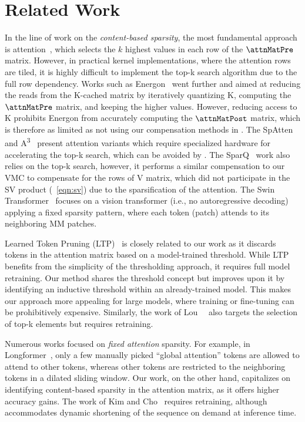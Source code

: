 \section{Related Work}
\label{sec:related_work}
%

%
In the line of work on the \textit{content-based sparsity}, the most fundamental approach is \topk attention~\cite{gupta2021memory}, which selects the  $k$ highest values in each row of the $\attnMatPre$ matrix. However, in practical kernel implementations, where the attention rows are tiled, it is highly difficult to implement the top-k search algorithm due to the full row dependency. Works such as Energon~\cite{zhou2022energon} went further and aimed at reducing the reads from the K-cached matrix by iteratively quantizing K, computing the $\attnMatPre$ matrix, and keeping the higher values. However, reducing access to K prohibits Energon from accurately computing the $\attnMatPost$ matrix, which is therefore as limited as not using our compensation methods in \topth. The SpAtten~\cite{wang2021spatten} and A\textsuperscript{3}~\cite{ham2020a3acceleratingattentionmechanisms} present \topk attention variants which require specialized hardware for accelerating the top-k search, which can be avoided by \topth. The SparQ~\cite{ribar2023sparq} work also relies on the top-k search, however, it performs a similar compensation to our VMC to compensate for the rows of V matrix, which did not participate in the SV product (~\ref{eqn:sv}) due to the sparsification of the attention. The Swin Transformer~\cite{liu2021swin} focuses on a vision transformer (i.e., no autoregressive decoding) applying a fixed sparsity pattern, where each token (patch) attends to its neighboring M\texttimes M patches.
%

%
Learned Token Pruning (LTP)~\cite{kim2022learned} is closely related to our work as it discards tokens in the attention matrix based on a model-trained threshold. While LTP benefits from the simplicity of the thresholding approach, it requires full model retraining. Our method shares the threshold concept but improves upon it by identifying an inductive threshold within an already-trained model. This makes our approach more appealing for large models, where training or fine-tuning can be prohibitively expensive. Similarly, the work of Lou~\etal~\cite{lou2024sparserfastermoreefficient} also targets the selection of top-k elements but requires retraining.
%

%
Numerous works focused on \textit{fixed attention} sparsity. For example, in Longformer~\cite{beltagy2020longformer}, only a few manually picked ``global attention'' tokens are allowed to attend to other tokens, whereas other tokens are restricted to the neighboring tokens in a dilated sliding window. Our work, on the other hand, capitalizes on identifying content-based sparsity in the attention matrix, as it offers higher accuracy gains. The work of Kim and Cho~\cite{kim2021lengthadaptivetransformertrainlength} requires retraining, although accommodates dynamic shortening of the sequence on demand at inference time.
%

